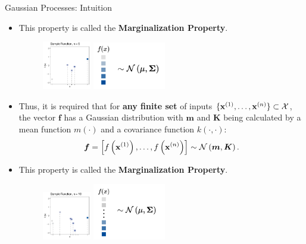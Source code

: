 \begin{frame}[c,allowframebreaks]{Gaussian Processes: Intuition}
\begin{itemize}
\item This property is called the \textbf{Marginalization Property}. 
\vspace{.15cm}
\begin{figure}
\includegraphics[width=0.2\textwidth]{figure_man/discrete/example_marginalization_5.pdf}
\includegraphics[width=0.3\textwidth]{figure_man/discrete/marginalization-5.png}
\end{figure}
\end{itemize}


\framebreak

\begin{itemize}
\item Thus, it is required that for \textbf{any finite set} of inputs $\{\mathbf{x}^{(1)},\dots,\mathbf{x}^{(n)}\} \subset \mathcal{X}$, the vector $\mathbf{f}$ has a Gaussian distribution with $\bm{m}$ and $\bm{K}$ being calculated by a mean function $m(\cdot)$ and a covariance function $k(\cdot,\cdot)$:\vspace{-.2cm}$$\bm{f} = \left[f\left(\mathbf{x}^{(1)}\right),\dots, f\left(\mathbf{x}^{(n)}\right)\right] \sim\mathcal{N}\left(\bm{m},\bm{K}\right).$$
    
\item This property is called the \textbf{Marginalization Property}. 
\vspace{.15cm}
\begin{figure}
\includegraphics[width=0.2\textwidth]{figure_man/discrete/example_marginalization_10.pdf}
\includegraphics[width=0.3\textwidth]{figure_man/discrete/marginalization-more.png}
\end{figure}
\end{itemize}



\end{frame}
